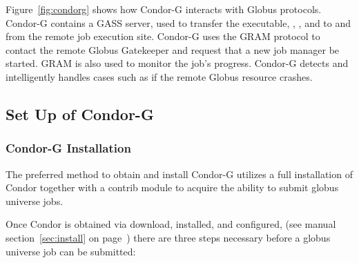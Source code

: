 Figure~\ref{fig:condorg} shows how Condor-G interacts with Globus protocols.
Condor-G contains a GASS server, used to transfer the executable,
, , and  to and from
the remote job execution site.
Condor-G uses the GRAM protocol to contact the remote Globus Gatekeeper
and request that a new job manager be started.
GRAM is also used to monitor the job's progress.
Condor-G detects and intelligently handles cases
such as if the remote Globus resource crashes.

\subsection{\label{sec:Condor-G-Setup}Set Up of Condor-G}

\subsubsection{\label{sec:Condor-G-Install}Condor-G Installation}
The preferred method to obtain and install Condor-G
utilizes a full installation
of Condor together with a contrib module to acquire the
ability to submit globus universe jobs.

Once Condor is obtained via download, installed, and configured,
(see manual
section~\ref{sec:install} on page~\pageref{sec:install})
there are three steps necessary before a globus universe job
can be submitted:

